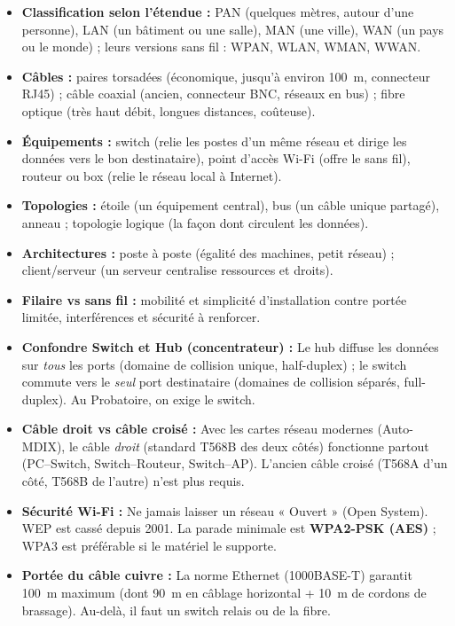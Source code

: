 \documentclass[11pt]{article}
\newcommand{\cle}[1]{{\popxbold\color{popdark}#1}}
\begin{document}
\begin{itemize}
  \item \textbf{Classification selon l'étendue :} PAN (quelques mètres, autour d'une personne), LAN (un bâtiment ou une salle), MAN (une ville), WAN (un pays ou le monde) ; leurs versions sans fil : WPAN, WLAN, WMAN, WWAN.
  \item \textbf{Câbles :} paires torsadées (économique, jusqu'à environ \SI{100}{m}, connecteur \cle{RJ45}) ; câble coaxial (ancien, connecteur \cle{BNC}, réseaux en bus) ; fibre optique (très haut débit, longues distances, coûteuse).
  \item \textbf{Équipements :} switch (relie les postes d'un même réseau et dirige les données vers le bon destinataire), point d'accès Wi-Fi (offre le sans fil), routeur ou box (relie le réseau local à Internet).
  \item \textbf{Topologies :} étoile (un équipement central), bus (un câble unique partagé), anneau ; topologie logique (la façon dont circulent les données).
  \item \textbf{Architectures :} poste à poste (égalité des machines, petit réseau) ; client/serveur (un serveur centralise ressources et droits).
  \item \textbf{Filaire vs sans fil :} mobilité et simplicité d'installation contre portée limitée, interférences et sécurité à renforcer.
\end{itemize}

\begin{attention}
\begin{itemize}
  \item \textbf{Confondre Switch et Hub (concentrateur) :} Le hub diffuse les données sur \emph{tous} les ports (domaine de collision unique, half-duplex) ; le switch commute vers le \emph{seul} port destinataire (domaines de collision séparés, full-duplex). Au Probatoire, on exige le switch.
  \item \textbf{Câble droit vs câble croisé :} Avec les cartes réseau modernes (Auto-MDIX), le câble \emph{droit} (standard T568B des deux côtés) fonctionne partout (PC–Switch, Switch–Routeur, Switch–AP). L'ancien câble croisé (T568A d'un côté, T568B de l'autre) n'est plus requis.
  \item \textbf{Sécurité Wi-Fi :} Ne jamais laisser un réseau « Ouvert » (Open System). WEP est cassé depuis 2001. La parade minimale est \textbf{WPA2-PSK (AES)} ; WPA3 est préférable si le matériel le supporte.
  \item \textbf{Portée du câble cuivre :} La norme Ethernet (1000BASE-T) garantit \SI{100}{m} maximum (dont \SI{90}{m} en câblage horizontal + \SI{10}{m} de cordons de brassage). Au-delà, il faut un switch relais ou de la fibre.
\end{itemize}
\end{attention}
\end{document}
